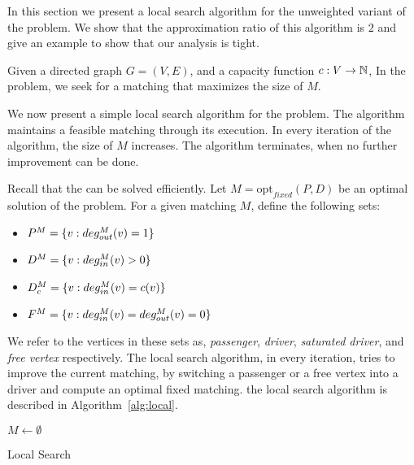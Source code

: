 \label{sec:uwcm}
In this section we present a local search algorithm for the unweighted
variant of the problem.
We show that the approximation ratio of this algorithm is $2$ and give an example
to show that our analysis is tight.

Given a directed graph $G = (V, E)$, 
and a capacity function ${c : V \rightarrow \mathbb{N}}$, 
In the \textsc{\UWCARPOOL{}} problem, 
we seek for a matching that maximizes the size of $M$.

We now present a simple local search algorithm for the problem. 
The algorithm maintains a feasible matching through its execution.
In every iteration of the algorithm, the size of $M$ increases.
The algorithm terminates, when no further improvement can be done. 

Recall that the \FIXEDCARPOOL{} can be solved efficiently.
Let $M = \text{opt}_{fixed}(P, D)$ be an optimal solution of the
\FIXEDCARPOOL{} problem.
%
For a given matching $M$, define the following sets:
\begin{itemize}
\item $P^M = \{v : deg^M_{out}(v) = 1\}$
\item $D^M = \{v : deg^M_{in}(v) > 0\}$
\item $D^M_c = \{v : deg^M_{in}(v) = c(v)\}$
\item $F^M = \{v : deg^M_{in}(v) = deg^M_{out}(v) = 0\}$ 
\end{itemize}
We refer to the vertices in these sets as, \emph{passenger}, 
\emph{driver}, \emph{saturated driver}, and \emph{free vertex} respectively.
The local search algorithm, in every iteration, 
tries to improve the current matching, 
by switching a passenger or a free vertex into a driver 
and compute an optimal fixed matching.
the local search algorithm is described in
Algorithm~\ref{alg:local}.

\begin{algorithm}
$M \leftarrow \emptyset$					\\

\caption{
\label{alg:local}
Local Search}
\end{algorithm}

